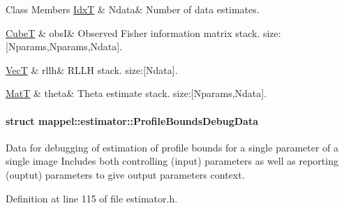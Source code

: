 \begin{DoxyFields}{Class Members}
\hyperlink{namespacemappel_ab17ec0f30b61ece292439d7ece81d3a8}{IdxT}\hypertarget{namespacemappel_1_1estimator_a7b3a27ef73e2603b2832e007899eb81e}{}\label{namespacemappel_1_1estimator_a7b3a27ef73e2603b2832e007899eb81e}
&
Ndata&
Number of data estimates. \\
\hline

\hyperlink{namespacemappel_ab2afab4e6c8805e83946670d882768c2}{CubeT}\hypertarget{namespacemappel_1_1estimator_a4a38be2455df942ae6b9d4c7b42db3cf}{}\label{namespacemappel_1_1estimator_a4a38be2455df942ae6b9d4c7b42db3cf}
&
obsI&
Observed Fisher information matrix stack. size\+:\mbox{[}Nparams,Nparams,Ndata\mbox{]}. \\
\hline

\hyperlink{namespacemappel_a2225ad69f358daa3f4f99282a35b9a3a}{VecT}\hypertarget{namespacemappel_1_1estimator_a70057c57635872bf7edefd7926f49f5e}{}\label{namespacemappel_1_1estimator_a70057c57635872bf7edefd7926f49f5e}
&
rllh&
R\+L\+LH stack. size\+:\mbox{[}Ndata\mbox{]}. \\
\hline

\hyperlink{namespacemappel_a7091ab87c528041f7e2027195fad8915}{MatT}\hypertarget{namespacemappel_1_1estimator_a076aeb06b77af53997525f146739069d}{}\label{namespacemappel_1_1estimator_a076aeb06b77af53997525f146739069d}
&
theta&
Theta estimate stack. size\+:\mbox{[}Nparams,Ndata\mbox{]}. \\
\hline

\end{DoxyFields}
\label{structmappel_1_1estimator_1_1ProfileBoundsDebugData}
\hypertarget{namespacemappel_1_1estimator_structmappel_1_1estimator_1_1ProfileBoundsDebugData}{}
\paragraph{struct mappel\+:\+:estimator\+:\+:Profile\+Bounds\+Debug\+Data}
Data for debugging of estimation of profile bounds for a single parameter of a single image Includes both controlling (input) parameters as well as reporting (ouptut) parameters to give output parameters context. 

Definition at line 115 of file estimator.\+h.

